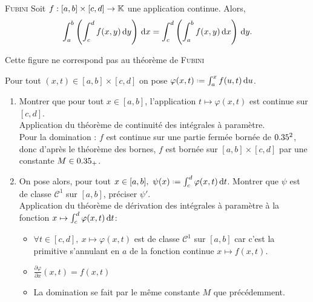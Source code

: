 
\begin{theo}{\textsc{Fubini}}
    Soit $f: [a,b] \times [c, d] \to \mathbb{K}$ une application continue. Alors,
    $$\int_{a}^{b} \left ( \int_{c}^{d} f(x,y) \, \mathrm{d} y \right) \, \mathrm{d} x = \int_{c}^{d} \left ( \int_{a}^{b} f(x,y) \, \mathrm{d} x \right) \, \mathrm{d} y.$$
\end{theo}

\begin{marginfigure}[5cm]
    \centering
    
    \caption*{\centering Cette figure ne correspond pas au théorème de \textsc{Fubini}}
\end{marginfigure}

\begin{preuve}
    Pour tout $(x, t) \in [a, b] \times [c, d]$ on pose $\varphi(x, t) \defeq \int_{a}^{x} f(u, t) \d u$. 
    \begin{enumerate}
        \item Montrer que pour tout $x \in [a, b]$, l'application $t \mapsto \varphi(x, t)$ est continue sur $[c, d]$. \\
        Application du théorème de continuité des intégrales à paramètre. \\
        Pour la domination : $f$ est continue sur une partie fermée bornée de $0.35^2$, donc d'après le théorème des bornes, $f$ est bornée sur $[a, b] \times [c, d]$ par une constante $M \in 0.35_+$.
        \item On pose alors, pour tout $x  \in [a, b],\ \psi(x) \defeq \int_{c}^{d} \varphi(x, t) \d t$. Montrer que $\psi$ est de classe $\mathscr{C}^1$ sur $[a, b]$, préciser $\psi'$. \\
        Application du théorème de dérivation des intégrales à paramètre à la fonction $x \mapsto \int_{c}^{d} \varphi(x, t) \, \mathrm{d} t$:
        \begin{itemize}
            \item $\forall t \in [c, d],\ x \mapsto \varphi(x, t)$ est de classe $\mathscr{C}^1$ sur $[a, b]$ car c'est la primitive s'annulant en $a$ de la fonction continue $x \mapsto f(x, t)$. 
            \item $\frac{\partial \varphi}{\partial x}(x, t) = f(x, t)$
            \item La domination se fait par le même constante $M$ que précédemment. 
        \end{itemize}

\end{enumerate}
\end{preuve}
